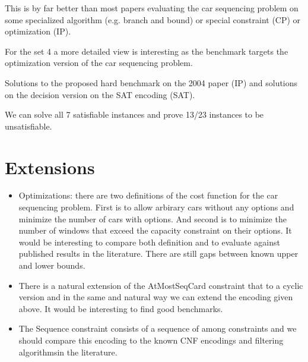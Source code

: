 \documentclass[]{llncs}
\begin{document}
This is by far better than most papers evaluating the car sequencing
problem on some specialized algorithm (e.g. branch and bound) or special
constraint (CP) or optimization (IP). 

For the set 4 a more detailed view is interesting as the benchmark
targets the optimization version of the car sequencing problem. 

\DTLsetseparator{,}

\begin{table}[htbp]
    \caption{Solutions to the proposed hard benchmark on the 2004 paper
    (IP) and solutions on the decision version on the SAT encoding
(SAT). }
    \centering
\end{table}


We can solve all 7 satisfiable instances and prove 13/23 instances to be
unsatisfiable. 


\section{Extensions}

\begin{itemize}
    \item Optimizations: there are two definitions of the cost function
        for the car sequencing problem. First is to allow arbirary cars
        without any options and minimize the number of cars with
        options. And second is to minimize the number of windows that
        exceed the capacity constraint on their options. It would be
        interesting to compare both definition and to evaluate against
        published results in the literature. There are still gaps
        between known upper and lower bounds. 
    \item There is a natural extension of the AtMostSeqCard constraint
        that to a cyclic version and in the same and natural way we can
        extend the encoding given above. It would be interesting to find
        good benchmarks. 
    \item The Sequence constraint consists of a sequence of among
        constraints and we should compare this encoding to the known CNF
        encodings and filtering algorithmsin the literature. 
\end{itemize}
\end{document}
